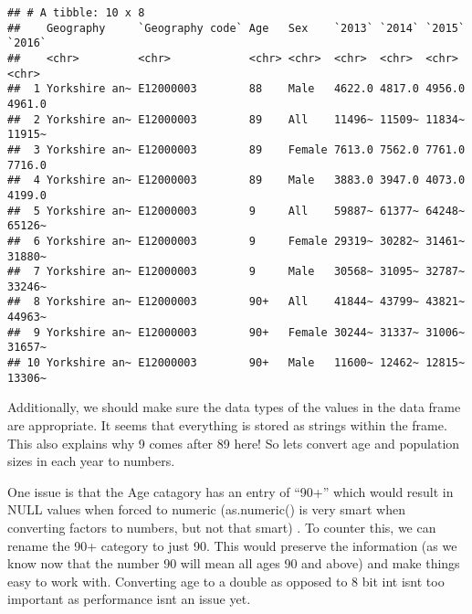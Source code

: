 \documentclass[]{article}
\newenvironment{Shaded}{\begin{snugshade}}{\end{snugshade}}
\newcommand{\KeywordTok}[1]{\textcolor[rgb]{0.13,0.29,0.53}{\textbf{#1}}}
\newcommand{\DecValTok}[1]{\textcolor[rgb]{0.00,0.00,0.81}{#1}}
\newcommand{\StringTok}[1]{\textcolor[rgb]{0.31,0.60,0.02}{#1}}
\newcommand{\CommentTok}[1]{\textcolor[rgb]{0.56,0.35,0.01}{\textit{#1}}}
\newcommand{\OperatorTok}[1]{\textcolor[rgb]{0.81,0.36,0.00}{\textbf{#1}}}
\newcommand{\NormalTok}[1]{#1}
\begin{document}
\begin{verbatim}
## # A tibble: 10 x 8
##    Geography     `Geography code` Age   Sex    `2013` `2014` `2015` `2016`
##    <chr>         <chr>            <chr> <chr>  <chr>  <chr>  <chr>  <chr> 
##  1 Yorkshire an~ E12000003        88    Male   4622.0 4817.0 4956.0 4961.0
##  2 Yorkshire an~ E12000003        89    All    11496~ 11509~ 11834~ 11915~
##  3 Yorkshire an~ E12000003        89    Female 7613.0 7562.0 7761.0 7716.0
##  4 Yorkshire an~ E12000003        89    Male   3883.0 3947.0 4073.0 4199.0
##  5 Yorkshire an~ E12000003        9     All    59887~ 61377~ 64248~ 65126~
##  6 Yorkshire an~ E12000003        9     Female 29319~ 30282~ 31461~ 31880~
##  7 Yorkshire an~ E12000003        9     Male   30568~ 31095~ 32787~ 33246~
##  8 Yorkshire an~ E12000003        90+   All    41844~ 43799~ 43821~ 44963~
##  9 Yorkshire an~ E12000003        90+   Female 30244~ 31337~ 31006~ 31657~
## 10 Yorkshire an~ E12000003        90+   Male   11600~ 12462~ 12815~ 13306~
\end{verbatim}

Additionally, we should make sure the data types of the values in the
data frame are appropriate. It seems that everything is stored as
strings within the frame. This also explains why 9 comes after 89 here!
So lets convert age and population sizes in each year to numbers.

One issue is that the Age catagory has an entry of ``90+'' which would
result in NULL values when forced to numeric (as.numeric() is very smart
when converting factors to numbers, but not that smart) . To counter
this, we can rename the 90+ category to just 90. This would preserve the
information (as we know now that the number 90 will mean all ages 90 and
above) and make things easy to work with. Converting age to a double as
opposed to 8 bit int isnt too important as performance isnt an issue
yet.

\begin{Shaded}
\end{Shaded}
\end{document}
